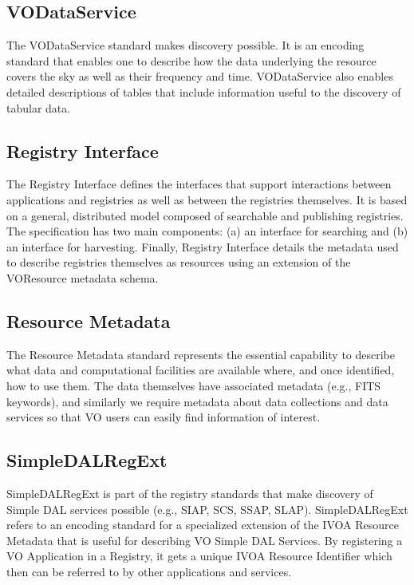 \documentclass[11pt,a4paper]{ivoa}
\begin{document}
\subsection{VODataService}

The VODataService standard makes discovery possible.  It is an encoding standard that enables one to 
describe how the data underlying the resource covers the sky as well as their frequency and time. 
VODataService also enables detailed descriptions of tables that include information useful to the 
discovery of tabular data. 

\subsection{Registry Interface}

The Registry Interface defines the interfaces that support interactions between applications and 
registries as well as between the registries themselves.  It is based on a general, distributed 
model composed of searchable and publishing registries. The specification has two main components: 
(a) an interface for searching and (b) an interface for harvesting.  Finally, Registry Interface 
details the metadata used to describe registries themselves as resources using an extension of the 
VOResource metadata schema.

\subsection{Resource Metadata}

The Resource Metadata standard represents the essential capability to describe what data and 
computational facilities are available where, and once identified, how to use them.  The data 
themselves have associated metadata (e.g., FITS keywords), and similarly we require metadata 
about data collections and data services so that VO users can easily find information of interest.  

\subsection{SimpleDALRegExt}

SimpleDALRegExt is part of the registry standards that make discovery of Simple DAL services 
possible (e.g., SIAP, SCS, SSAP, SLAP).  SimpleDALRegExt refers to an encoding standard for a 
specialized extension of the IVOA Resource Metadata that is useful for describing VO Simple DAL 
Services.  By registering a VO Application in a Registry, it gets a unique IVOA Resource 
Identifier which then can be referred to by other applications and services. 
\end{document}
